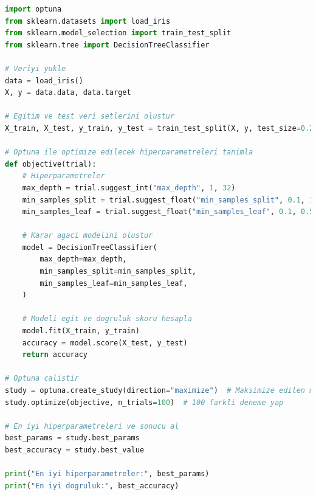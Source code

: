 \begin{lstlisting}[language=Python]
import optuna
from sklearn.datasets import load_iris
from sklearn.model_selection import train_test_split
from sklearn.tree import DecisionTreeClassifier

# Veriyi yukle
data = load_iris()
X, y = data.data, data.target

# Egitim ve test veri setlerini olustur
X_train, X_test, y_train, y_test = train_test_split(X, y, test_size=0.2, random_state=42)

# Optuna ile optimize edilecek hiperparametreleri tanimla
def objective(trial):
    # Hiperparametreler
    max_depth = trial.suggest_int("max_depth", 1, 32)
    min_samples_split = trial.suggest_float("min_samples_split", 0.1, 1.0)
    min_samples_leaf = trial.suggest_float("min_samples_leaf", 0.1, 0.5)

    # Karar agaci modelini olustur
    model = DecisionTreeClassifier(
        max_depth=max_depth,
        min_samples_split=min_samples_split,
        min_samples_leaf=min_samples_leaf,
    )

    # Modeli egit ve dogruluk skoru hesapla
    model.fit(X_train, y_train)
    accuracy = model.score(X_test, y_test)
    return accuracy

# Optuna calistir
study = optuna.create_study(direction="maximize")  # Maksimize edilen metrik (dogruluk)
study.optimize(objective, n_trials=100)  # 100 farkli deneme yap

# En iyi hiperparametreleri ve sonucu al
best_params = study.best_params
best_accuracy = study.best_value

print("En iyi hiperparametreler:", best_params)
print("En iyi dogruluk:", best_accuracy)
\end{lstlisting}

\newpage